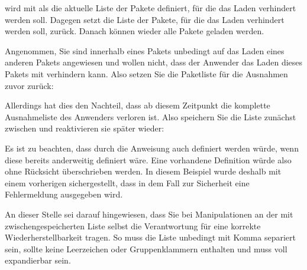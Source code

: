 \begin{Declaration}
\end{Declaration}
 wird mit
als die aktuelle Liste der Pakete definiert, für die das Laden verhindert
werden soll. Dagegen setzt
die Liste der Pakete, für die das Laden verhindert werden soll, zurück. Danach
können wieder alle Pakete geladen werden.
\begin{Example}
  Angenommen, Sie sind innerhalb eines Pakets unbedingt auf das Laden eines
  anderen Pakets angewiesen und wollen nicht, dass der Anwender das Laden
  dieses Pakets mit
  verhindern kann. Also setzen Sie die Paketliste für die Ausnahmen zuvor
  zurück:
\begin{lstcode}
  \ResetPreventPackageFromLoading
  \RequirePackage{foo}
\end{lstcode}
  Allerdings hat dies den Nachteil, dass ab diesem Zeitpunkt die komplette
  Ausnahmeliste des Anwenders verloren ist. Also speichern Sie die Liste
  zunächst zwischen und reaktivieren sie später wieder:
\begin{lstcode}
  \newcommand*{\Users@PreventList}{}%
  \StorePreventPackageFromLoading\Users@PreventList
  \ResetPreventPackageFromLoading
  \RequirePackage{foo}
  \PreventPackageFromLoading{\Users@PreventList}
\end{lstcode}
  Es ist zu beachten, dass  durch 
  die Anweisung  auch definiert
  werden würde, wenn diese bereits anderweitig definiert wäre. Eine vorhandene
  Definition würde also ohne Rücksicht überschrieben werden. In diesem
  Beispiel wurde deshalb mit einem vorherigen 
  sichergestellt, dass in dem Fall zur Sicherheit eine Fehlermeldung
  ausgegeben wird.
\end{Example}
An dieser Stelle sei darauf hingewiesen, dass Sie bei Manipulationen an der mit
 zwischengespeicherten Liste selbst die
Verantwortung für eine korrekte Wiederherstellbarkeit tragen. So muss die
Liste unbedingt mit Komma separiert sein, sollte keine Leerzeichen oder
Gruppenklammern enthalten und muss voll expandierbar sein.%


